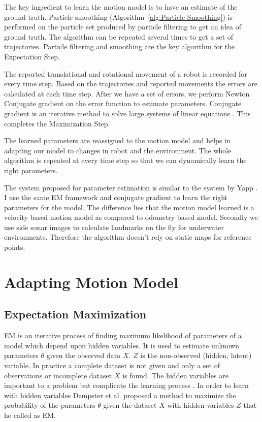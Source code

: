 \documentclass[12pt]{dalcsthesis}
\begin{document}
The key ingredient to learn the motion model is to have an estimate of the ground truth. Particle smoothing (Algorithm~\ref{alg:Particle Smoothing}) is performed on the particle set produced by particle filtering to get an idea of ground truth. The algorithm can be repeated several times to get a set of trajectories. Particle filtering and smoothing are the key algorithm for the Expectation Step. 

The reported translational and rotational movement of a robot is recorded for every time step. Based on the trajectories and reported movements the errors are calculated at each time step. After we have a set of errors, we perform Newton Conjugate gradient on the error function to estimate parameters. Conjugate gradient is an iterative method to solve large systems of linear equations \cite{shewchuk1994introduction}. This completes the Maximization Step.

The learned parameters are reassigned to the motion model and helps in adapting our model to changes in robot and the environment. The whole algorithm is repeated at every time step so that we can dynamically learn the right parameters.

The system proposed for parameter estimation is similar to the system by Yapp \cite{Yap2008}. I use the same EM framework and conjugate gradient to learn the right parameters for the model. The difference lies that the motion model learned is a velocity based motion model as compared to odometry based model. Secondly we use side sonar images to calculate landmarks on the fly for underwater environments. Therefore the algorithm doesn't rely on static maps for reference points.

\section{Adapting Motion Model}
\label{adapting the motion model}
\subsection{Expectation Maximization}

EM is an iterative process of finding maximum likelihood of parameters of a model which depend upon hidden variables. It is used to estimate unknown parameters $\theta$ given the observed data $X$. $Z$ is the non-observed (hidden, latent) variable. In practice a complete dataset is not given and only a set of observations or incomplete dataset $X$ is found. The hidden variables are important to a problem but complicate the learning process \cite{russell2003artificial}. In order to learn with hidden variables Dempster et al. \cite{dempster1977maximum} proposed a method to maximize the probability of the parameters $\theta$ given the dataset $X$ with hidden variables $Z$ that he called as EM.
\end{document}

